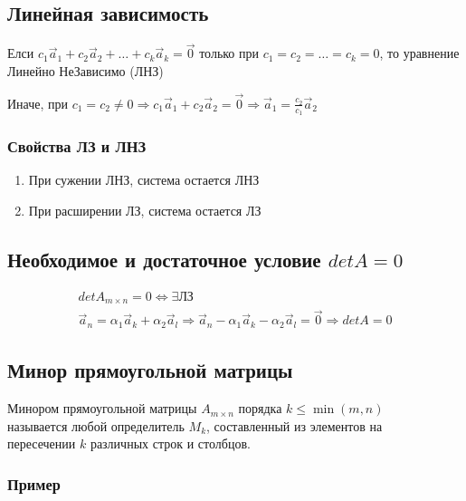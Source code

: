 \documentclass{article}
\begin{document}
\subsection{Линейная зависимость}

Елси $c_1 \vec{a}_1 + c_2 \vec{a}_2 + \dots + c_k \vec{a}_k = \vec{0}$ только при
$c_1 = c_2 = \dots = c_k = 0$, то уравнение Линейно НеЗависимо (ЛНЗ)

Иначе, при $c_1 = c_2 \ne 0 \Rightarrow c_1 \vec{a}_1 + c_2 \vec{a}_2 = \vec{0} \Rightarrow \vec{a}_1 = \frac{c_2}{c_1} \vec{a}_2$

\subsubsection{Свойства ЛЗ и ЛНЗ}

\begin{enumerate}
	\item При сужении ЛНЗ, система остается ЛНЗ
	\item При расширении ЛЗ, система остается ЛЗ
\end{enumerate}

\subsection{Необходимое и достаточное условие $det A = 0$}

\begin{gather*}
	det A_{m \times n} = 0 \Leftrightarrow \exists \text{ЛЗ} \\
	\vec{a}_n = \alpha_1 \vec{a}_k + \alpha_2 \vec{a}_l \Rightarrow
	\vec{a}_n - \alpha_1 \vec{a}_k - \alpha_2 \vec{a}_l = \vec{0} \Rightarrow det A = 0
\end{gather*}

\subsection{Минор прямоугольной матрицы}

Минором прямоугольной матрицы $A_{m \times n}$ порядка $k \le \min(m, n)$ \\
называется любой определитель $M_k$, составленный из элементов на \\
пересечении $k$ различных строк и столбцов.

\subsubsection*{Пример}
\end{document}
